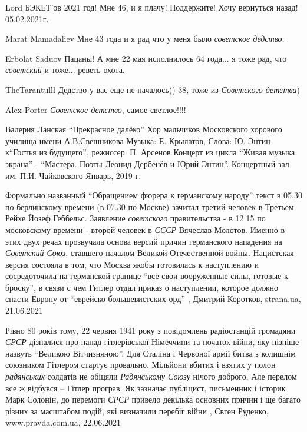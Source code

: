 Lord БЭКЕТ'ов
2021 год! Мне 46, и я плачу! Поддержите! Хочу вернуться назад! 05.02.2021г.

Marat Mamadaliev
Мне 43 года и я рад что у меня было \emph{советское дедство}. 

Erbolat Saduov
Пацаны! А мне 22 мая исполнилось 64 года... я тоже рад, что \emph{советский} и тоже... 
реветь охота. 

TheTarantulll
Дедство у вас еще не началось)) 38, тоже из \emph{Советского детства}) 

Alex Porter
\emph{Советское детство}, самое светлое!!!! 

Валерия Ланская \enquote{Прекрасное далёко}
Хор мальчиков Московского хорового училища имени А.В.Свешникова
Музыка: Е. Крылатов, Слова: Ю. Энтин
к\ф \enquote{Гостья из будущего},  режиссер: П. Арсенов
Концерт из цикла \enquote{Живая музыка экрана} - \enquote{Мастера. Поэты Леонид Дербенёв и Юрий
Энтин}.  Концертный зал им. П.И. Чайковского
Январь, 2019 г.

Формально названный \enquote{Обращением фюрера к германскому народу} текст в
05.30 по берлинскому времени (в 07.30 по Москве) зачитал третий человек в
Третьем Рейхе Йозеф Геббельс. Заявление \emph{советского} правительства - в
12.15 по московскому времени - второй человек в \emph{СССР} Вячеслав Молотов.
Именно в этих двух речах прозвучала основа версий причин германского нападения
на \emph{Советский Союз}, ставшего началом Великой Отечественной войны.
Нацистская версия состояла в том, что Москва якобы готовилась к наступлению и
сосредоточила на германской границе \enquote{все свои вооруженные силы, готовые
к броску}, в связи с чем Гитлер отдал приказ о наступлении, которое должно
спасти Европу от \enquote{еврейско-большевистских орд}
, 
Дмитрий Коротков, strana.ua, 21.06.2021

Рівно 80 років тому, 22 червня 1941 року з повідомлень радіостанцій громадяни
\emph{СРСР} дізналися про напад гітлерівської Німеччини та початок війни, яку пізніше
назвуть \enquote{Великою Вітчизняною}.  Для Сталіна і Червоної армії битва з колишнім
союзником Гітлером стартує провально. Мільйони вбитих і взятих у полон
\emph{радянських} солдатів не обіцяли \emph{Радянському Союзу} нічого доброго. Але перелом
все ж відбувся – Гітлер програв.  Як зазначає публіцист, письменник і історик
Марк Солонін, до перемоги \emph{СРСР} привело декілька основних причин і ще багато
різних за масштабом подій, які визначили перебіг війни
, 
Євген Руденко, www.pravda.com.ua, 22.06.2021


